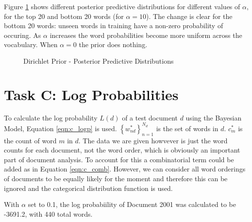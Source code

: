 \documentclass[11pt]{amsart}
\begin{document}
Figure \ref{fig:taskb} shows different posterior predictive distributions for different values of $\alpha$, for the top 20 and bottom 20 words (for $\alpha = 10$). The change is clear for the bottom 20 words: unseen words in training have a non-zero probability of occuring. As $\alpha$ increases the word probabilities become more uniform across the vocabulary. When $\alpha = 0$ the prior does nothing.
\begin{figure}[h]
    \centering
    \caption{Dirichlet Prior - Posterior Predictive Distributions} \label{fig:taskb}
\end{figure}

\vspace*{-0.5cm}
\section{Task C: Log Probabilities} \label{sec:c}
To calculate the log probability $L(d)$ of a test document $d$ using the Bayesian Model, Equation \ref{eqn:c_logp} is used. $\left\{w_{nd}^*\right\}^{N_d}_{n=1}$ is the set of words in $d$. $c_m^*$ is the count of word $m$ in $d$. The data we are given howvever is just the word counts for each document, not the word order, which is obviously an important part of document analysis. To account for this a combinatorial term could be added as in Equation \ref{eqn:c_comb}. However, we can consider all word orderings of documents to be equally likely for the moment and therefore this can be ignored and the categorical distribution function is used.

With $\alpha$ set to 0.1, the log probabiility of Document 2001 was calculated to be -3691.2, with 440 total words.
\end{document}
